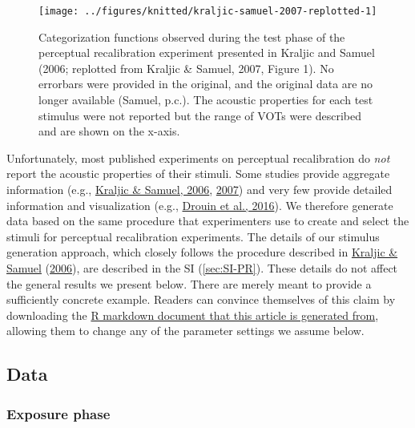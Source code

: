 \documentclass[
  11pt,
  english,
  man,floatsintext]{apa6}
\begin{document}
\begin{figure}

{\centering \texttt{[image: ../figures/knitted/kraljic-samuel-2007-replotted-1]} 

}

\caption{Categorization functions observed during the test phase of the perceptual recalibration experiment presented in Kraljic and Samuel (2006; replotted from Kraljic \& Samuel, 2007, Figure 1). No errorbars were provided in the original, and the original data are no longer available (Samuel, p.c.). The acoustic properties for each test stimulus were not reported but the range of VOTs were described and are shown on the x-axis.}\label{fig:kraljic-samuel-2007-replotted}
\end{figure}

Unfortunately, most published experiments on perceptual recalibration do \emph{not} report the acoustic properties of their stimuli. Some studies provide aggregate information (e.g., \protect\hyperlink{ref-kraljic-samuel2006}{Kraljic \& Samuel, 2006}, \protect\hyperlink{ref-kraljic-samuel2007}{2007}) and very few provide detailed information and visualization (e.g., \protect\hyperlink{ref-drouin2016}{Drouin et al., 2016}).
We therefore generate data based on the same procedure that experimenters use to create and select the stimuli for perceptual recalibration experiments. The details of our stimulus generation approach, which closely follows the procedure described in \protect\hyperlink{ref-kraljic-samuel2006}{Kraljic \& Samuel} (\protect\hyperlink{ref-kraljic-samuel2006}{2006}), are described in the SI (\ref{sec:SI-PR}). These details do not affect the general results we present below. There are merely meant to provide a sufficiently concrete example. Readers can convince themselves of this claim by downloading the \href{https://osf.io/DO-NOT-FORGET-TO-ADD-THE-OSF-URL-HERE-XXX}{R markdown document that this article is generated from}, allowing them to change any of the parameter settings we assume below.

\hypertarget{data}{%
\subsection{Data}\label{data}}

\hypertarget{exposure-phase}{%
\subsubsection{Exposure phase}\label{exposure-phase}}
\end{document}
